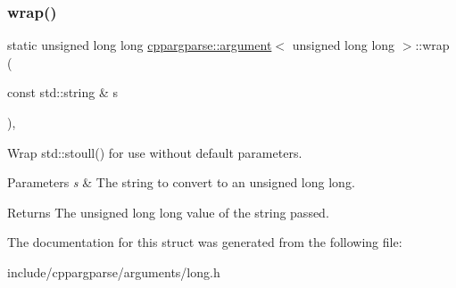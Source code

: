\subsubsection{\texorpdfstring{wrap()}{wrap()}}
{\footnotesize\ttfamily static unsigned long long \hyperlink{structcppargparse_1_1argument}{cppargparse\+::argument}$<$ unsigned long long $>$\+::wrap (\begin{DoxyParamCaption}\item[{const std\+::string \&}]{s }\end{DoxyParamCaption})\hspace{0.3cm}{\ttfamily [inline]}, {\ttfamily [static]}}



Wrap std\+::stoull() for use without default parameters. 


\begin{DoxyParams}{Parameters}
{\em s} & The string to convert to an unsigned long long.\\
\hline
\end{DoxyParams}
\begin{DoxyReturn}{Returns}
The unsigned long long value of the string passed. 
\end{DoxyReturn}


The documentation for this struct was generated from the following file\+:\begin{DoxyCompactItemize}
\item 
include/cppargparse/arguments/long.\+h\end{DoxyCompactItemize}
